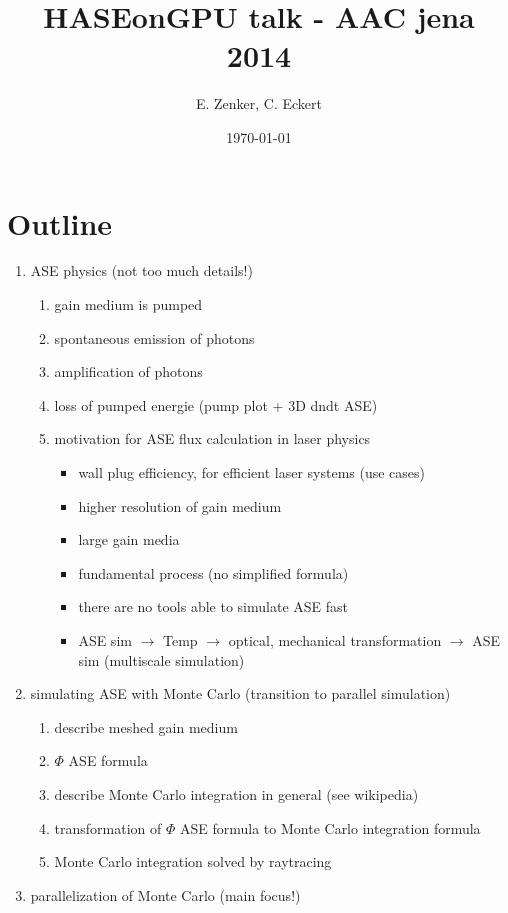 \documentclass[12pt]{article}
\title{HASEonGPU talk - AAC jena 2014}
\author{E. Zenker, C. Eckert}
\date{\today}
\begin{document}
\maketitle

\section{Outline}
\begin{enumerate}
\item ASE physics (not too much details!)
  \begin{enumerate}
  \item gain medium is pumped
  \item spontaneous emission of photons
  \item amplification of photons
  \item loss of pumped energie (pump plot + 3D dndt ASE)
  \item motivation for ASE flux calculation in laser physics
    \begin{itemize}
      \item wall plug efficiency, for efficient laser systems (use
        cases)
      \item higher resolution of gain medium
      \item large gain media
      \item fundamental process (no simplified formula)
      \item there are no tools able to simulate ASE fast
      \item ASE sim $\rightarrow$ Temp $\rightarrow$ optical,
        mechanical transformation $\rightarrow$ ASE sim (multiscale
        simulation)
    \end{itemize}
  \end{enumerate}
\item simulating ASE with Monte Carlo (transition to parallel simulation)
  \begin{enumerate}
  \item describe meshed gain medium
  \item $\Phi$ ASE formula
  \item describe Monte Carlo integration in general (see wikipedia)
  \item transformation of $\Phi$ ASE formula to Monte Carlo integration formula
  \item Monte Carlo integration solved by raytracing
  \end{enumerate}
\item parallelization of Monte Carlo (main focus!)

\end{enumerate}
\end{document}
